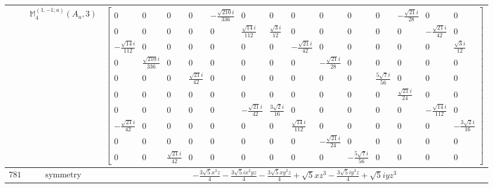 \documentclass[fleqn,8pt,landscape]{jsarticle}
\begin{document}
\begin{longtable}{ccc}
$  $ & $ \mathbb{M}_{4}^{(1,-1;a)}(A_{u},3) $ & $ \begin{bmatrix} 0 & 0 & 0 & 0 & - \frac{\sqrt{210} i}{336} & 0 & 0 & 0 & 0 & 0 & 0 & - \frac{\sqrt{21} i}{28} & 0 & 0 \\ 0 & 0 & 0 & 0 & 0 & \frac{\sqrt{14} i}{112} & \frac{\sqrt{3} i}{12} & 0 & 0 & 0 & 0 & 0 & - \frac{\sqrt{21} i}{42} & 0 \\ - \frac{\sqrt{14} i}{112} & 0 & 0 & 0 & 0 & 0 & 0 & - \frac{\sqrt{21} i}{42} & 0 & 0 & 0 & 0 & 0 & \frac{\sqrt{3} i}{12} \\ 0 & \frac{\sqrt{210} i}{336} & 0 & 0 & 0 & 0 & 0 & 0 & - \frac{\sqrt{21} i}{28} & 0 & 0 & 0 & 0 & 0 \\ 0 & 0 & 0 & \frac{\sqrt{21} i}{42} & 0 & 0 & 0 & 0 & 0 & 0 & \frac{5 \sqrt{7} i}{56} & 0 & 0 & 0 \\ 0 & 0 & 0 & 0 & 0 & 0 & 0 & 0 & 0 & 0 & 0 & \frac{\sqrt{21} i}{24} & 0 & 0 \\ 0 & 0 & 0 & 0 & 0 & - \frac{\sqrt{21} i}{42} & \frac{3 \sqrt{2} i}{16} & 0 & 0 & 0 & 0 & 0 & - \frac{\sqrt{14} i}{112} & 0 \\ - \frac{\sqrt{21} i}{42} & 0 & 0 & 0 & 0 & 0 & 0 & \frac{\sqrt{14} i}{112} & 0 & 0 & 0 & 0 & 0 & - \frac{3 \sqrt{2} i}{16} \\ 0 & 0 & 0 & 0 & 0 & 0 & 0 & 0 & - \frac{\sqrt{21} i}{24} & 0 & 0 & 0 & 0 & 0 \\ 0 & 0 & \frac{\sqrt{21} i}{42} & 0 & 0 & 0 & 0 & 0 & 0 & - \frac{5 \sqrt{7} i}{56} & 0 & 0 & 0 & 0 \end{bmatrix} $ \\ \hline
$ 781 $ & $ \text{symmetry} $ & $ - \frac{3 \sqrt{5} x^{3} z}{4} - \frac{3 \sqrt{5} i x^{2} y z}{4} - \frac{3 \sqrt{5} x y^{2} z}{4} + \sqrt{5} x z^{3} - \frac{3 \sqrt{5} i y^{3} z}{4} + \sqrt{5} i y z^{3} $ \\

\end{longtable}
\end{document}
